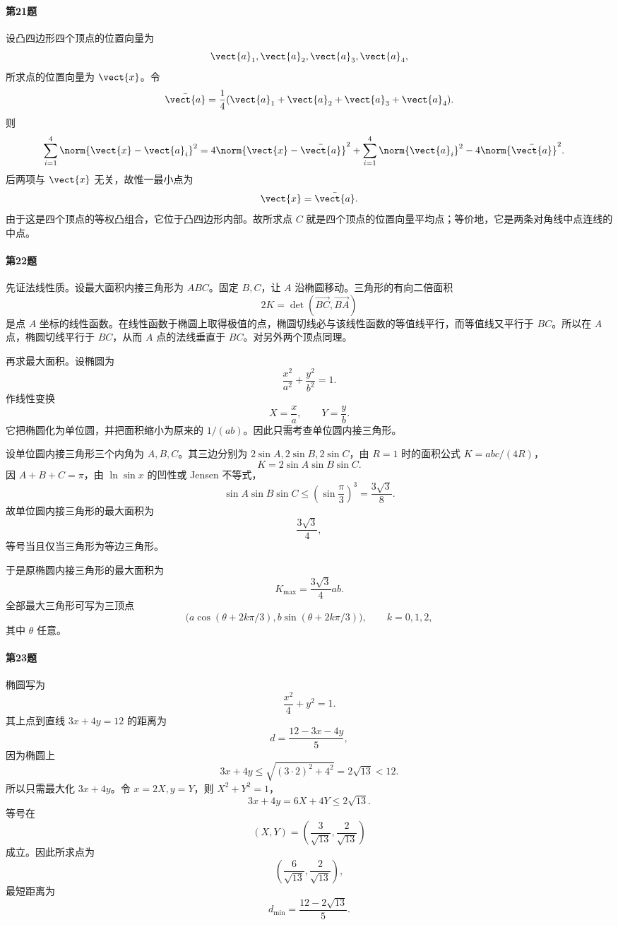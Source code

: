 \paragraph{第21题}
\begin{xsolution}
设凸四边形四个顶点的位置向量为
\[
  \vect{a}_1,\vect{a}_2,\vect{a}_3,\vect{a}_4,
\]
所求点的位置向量为 $\vect{x}$。令
\[
  \bar{\vect{a}}
  =\frac14(\vect{a}_1+\vect{a}_2+\vect{a}_3+\vect{a}_4).
\]
则
\[
\begin{aligned}
  \sum_{i=1}^4\norm{\vect{x}-\vect{a}_i}^2
  &=4\norm{\vect{x}-\bar{\vect{a}}}^2
  +\sum_{i=1}^4\norm{\vect{a}_i}^2
  -4\norm{\bar{\vect{a}}}^2.
\end{aligned}
\]
后两项与 $\vect{x}$ 无关，故惟一最小点为
\[
  \vect{x}=\bar{\vect{a}}.
\]
由于这是四个顶点的等权凸组合，它位于凸四边形内部。故所求点 $C$ 就是四个顶点的位置向量平均点；等价地，它是两条对角线中点连线的中点。
\end{xsolution}

\paragraph{第22题}
\begin{xsolution}
先证法线性质。设最大面积内接三角形为 $ABC$。固定 $B,C$，让 $A$ 沿椭圆移动。三角形的有向二倍面积
\[
  2K=\det(\overrightarrow{BC},\overrightarrow{BA})
\]
是点 $A$ 坐标的线性函数。在线性函数于椭圆上取得极值的点，椭圆切线必与该线性函数的等值线平行，而等值线又平行于 $BC$。所以在 $A$ 点，椭圆切线平行于 $BC$，从而 $A$ 点的法线垂直于 $BC$。对另外两个顶点同理。

再求最大面积。设椭圆为
\[
  \frac{x^2}{a^2}+\frac{y^2}{b^2}=1.
\]
作线性变换
\[
  X=\frac xa,
  \qquad
  Y=\frac yb.
\]
它把椭圆化为单位圆，并把面积缩小为原来的 $1/(ab)$。因此只需考查单位圆内接三角形。

设单位圆内接三角形三个内角为 $A,B,C$。其三边分别为 $2\sin A,2\sin B,2\sin C$，由 $R=1$ 时的面积公式 $K=abc/(4R)$，
\[
  K=2\sin A\sin B\sin C.
\]
因 $A+B+C=\pi$，由 $\ln\sin x$ 的凹性或 Jensen 不等式，
\[
  \sin A\sin B\sin C
  \le\left(\sin\frac\pi3\right)^3
  =\frac{3\sqrt3}{8}.
\]
故单位圆内接三角形的最大面积为
\[
  \frac{3\sqrt3}{4},
\]
等号当且仅当三角形为等边三角形。

于是原椭圆内接三角形的最大面积为
\[
  K_{\max}=\frac{3\sqrt3}{4}ab.
\]
全部最大三角形可写为三顶点
\[
  \bigl(a\cos(\theta+2k\pi/3),
  b\sin(\theta+2k\pi/3)\bigr),
  \qquad k=0,1,2,
\]
其中 $\theta$ 任意。
\end{xsolution}

\paragraph{第23题}
\begin{xsolution}
椭圆写为
\[
  \frac{x^2}{4}+y^2=1.
\]
其上点到直线 $3x+4y=12$ 的距离为
\[
  d=\frac{12-3x-4y}{5},
\]
因为椭圆上
\[
  3x+4y\le\sqrt{(3\cdot2)^2+4^2}=2\sqrt{13}<12.
\]
所以只需最大化 $3x+4y$。令 $x=2X,y=Y$，则 $X^2+Y^2=1$，
\[
  3x+4y=6X+4Y\le2\sqrt{13}.
\]
等号在
\[
  (X,Y)=\left(\frac3{\sqrt{13}},\frac2{\sqrt{13}}\right)
\]
成立。因此所求点为
\[
  \left(\frac6{\sqrt{13}},\frac2{\sqrt{13}}\right),
\]
最短距离为
\[
  d_{\min}=\frac{12-2\sqrt{13}}5.
\]
\end{xsolution}

